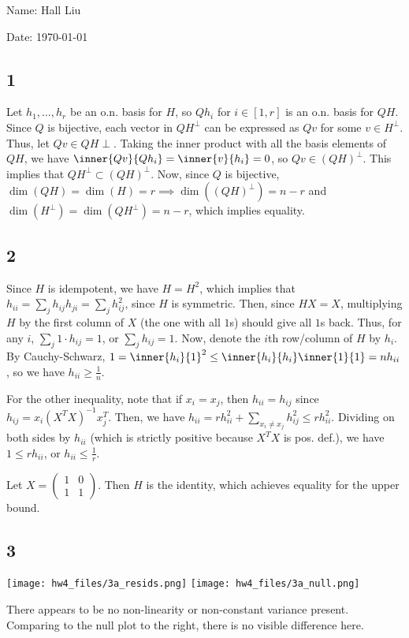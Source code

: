 \documentclass{article}
\newcommand{\openm}{\begin{pmatrix}}
\newcommand{\closem}{\end{pmatrix}}
\begin{document}
Name: Hall Liu

Date: \today 
\vspace{1.5cm}
\subsection*{1}
Let $h_1,\ldots,h_r$ be an o.n. basis for $H$, so $Qh_i$ for $i\in[1,r]$ is an o.n. basis for $QH$. Since $Q$ is bijective, each vector in $QH^\perp$ can be expressed as $Qv$ for some $v\in H^\perp$. Thus, let $Qv\in QH\perp$. Taking the inner product with all the basis elements of $QH$, we have $\inner{Qv}{Qh_i}=\inner{v}{h_i}=0$, so $Qv\in(QH)^\perp$. This implies that $QH^\perp\subset(QH)^\perp$. Now, since $Q$ is bijective, $\dim(QH)=\dim(H)=r\implies\dim((QH)^\perp)=n-r$ and $\dim(H^\perp)=\dim(QH^\perp)=n-r$, which implies equality.
\subsection*{2}
Since $H$ is idempotent, we have $H=H^2$, which implies that $h_{ii}=\sum_jh_{ij}h_{ji}=\sum_jh_{ij}^2$, since $H$ is symmetric. Then, since $HX=X$, multiplying $H$ by the first column of $X$ (the one with all $1$s) should give all $1$s back. Thus, for any $i$, $\sum_j1\cdot h_{ij}=1$, or $\sum_j h_{ij}=1$. Now, denote the $i$th row/column of $H$ by $h_i$. By Cauchy-Schwarz, $1=\inner{h_i}{1}^2\leq\inner{h_i}{h_i}\inner{1}{1}=nh_{ii}$, so we have $h_{ii}\geq\frac{1}{n}$.

For the other inequality, note that if $x_i=x_j$, then $h_{ii}=h_{ij}$ since $h_{ij}=x_i(X^TX)^{-1}x_j^T$. Then, we have $h_{ii}=rh_{ii}^2+\sum_{x_i\neq x_j}h_{ij}^2\leq rh_{ii}^2$. Dividing on both sides by $h_{ii}$ (which is strictly positive because $X^TX$ is pos. def.), we have $1\leq rh_{ii}$, or $h_{ii}\leq\frac{1}{r}$.

Let $X=\openm1&0\\1&1\closem$. Then $H$ is the identity, which achieves equality for the upper bound. 
\subsection*{3}
\noindent\texttt{[image: hw4\_files/3a\_resids.png]}
\texttt{[image: hw4\_files/3a\_null.png]}

There appears to be no non-linearity or non-constant variance present. Comparing to the null plot to the right, there is no visible difference here.
\end{document}
